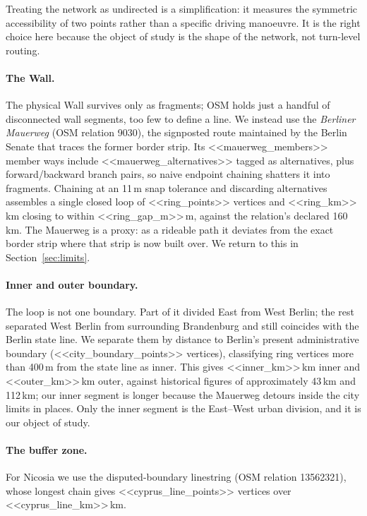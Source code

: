 \documentclass[11pt,a4paper]{article}
\begin{document}
Treating the network as undirected is a simplification: it measures the
symmetric accessibility of two points rather than a specific driving manoeuvre.
It is the right choice here because the object of study is the shape of the
network, not turn-level routing.

\paragraph{The Wall.} The physical Wall survives only as fragments; OSM holds
just a handful of disconnected wall segments, too few to define a line. We
instead use the \emph{Berliner Mauerweg} (OSM relation 9030), the signposted
route maintained by the Berlin Senate that traces the former border strip. Its
<<mauerweg_members>> member ways include <<mauerweg_alternatives>> tagged as
alternatives, plus forward/backward branch pairs, so naive endpoint chaining
shatters it into fragments. Chaining at an 11\,m snap tolerance and discarding
alternatives assembles a single closed loop of <<ring_points>> vertices and
<<ring_km>>\,km closing to within <<ring_gap_m>>\,m, against the relation's
declared 160\,km. The Mauerweg is a proxy: as a rideable path it deviates from
the exact border strip where that strip is now built over. We return to this in
Section~\ref{sec:limits}.

\paragraph{Inner and outer boundary.} The loop is not one boundary. Part of it
divided East from West Berlin; the rest separated West Berlin from surrounding
Brandenburg and still coincides with the Berlin state line. We separate them by
distance to Berlin's present administrative boundary
(<<city_boundary_points>> vertices), classifying ring vertices more than 400\,m
from the state line as inner. This gives <<inner_km>>\,km inner and
<<outer_km>>\,km outer, against historical figures of approximately 43\,km and
112\,km; our inner segment is longer because the Mauerweg detours inside the
city limits in places. Only the inner segment is the East--West urban division,
and it is our object of study.

\paragraph{The buffer zone.} For Nicosia we use the disputed-boundary linestring
(OSM relation 13562321), whose longest chain gives <<cyprus_line_points>>
vertices over <<cyprus_line_km>>\,km.
\end{document}
